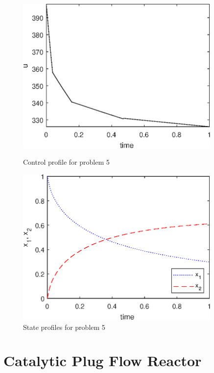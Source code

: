 \begin{figure}[htb]
\begin{minipage}[t]{0.5\linewidth}
\centering
\includegraphics[width=0.9\textwidth]{examples/problem5/graphs/u_524a.eps}
\caption[Problem 5: Control profile]{Control profile for problem 5}
\label{fig:prob5_u}  
\end{minipage}
\begin{minipage}[t]{0.5\linewidth}
\centering
\includegraphics[width=0.9\textwidth]{examples/problem5/graphs/x12_524a.eps}
\caption[Problem 4: State profiles]{State profiles for problem 5}
\label{fig:prob5_x} 
\end{minipage}
\end{figure}

\section{Catalytic Plug Flow Reactor}
\label{sec:prob6}

